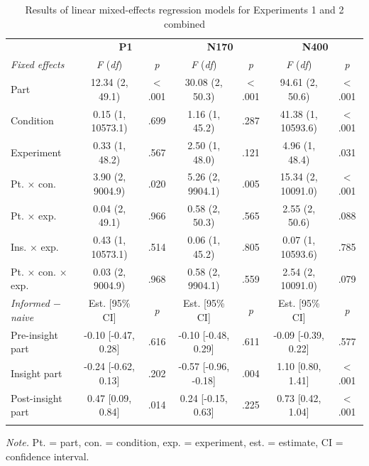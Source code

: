 \documentclass[
  english,
  man,12pt,twoside]{apa7}
\begin{document}
\begin{table}[tbp]

\begin{center}
\begin{threeparttable}

\caption{\label{tab:joint-table}Results of linear mixed-effects regression models for Experiments 1 and 2 combined}

\footnotesize{

\begin{tabular}{lcccccc}
\toprule
 & \multicolumn{2}{c}{\textbf{P1}} & \multicolumn{2}{c}{\textbf{N170}} & \multicolumn{2}{c}{\textbf{N400}} \\
\cmidrule(r){2-3} \cmidrule(r){4-5} \cmidrule(r){6-7}
\textit{Fixed effects} & \textit{F} (\textit{df}) & \textit{p} & \textit{F} (\textit{df}) & \textit{p} & \textit{F} (\textit{df}) & \textit{p}\\
\midrule
Part & 12.34 (2, 49.1) & < .001 & 30.08 (2, 50.3) & < .001 & 94.61 (2, 50.6) & < .001\\
Condition & 0.15 (1, 10573.1) & .699 & 1.16 (1, 45.2) & .287 & 41.38 (1, 10593.6) & < .001\\
Experiment & 0.33 (1, 48.2) & .567 & 2.50 (1, 48.0) & .121 & 4.96 (1, 48.4) & .031\\
Pt. × con. & 3.90 (2, 9004.9) & .020 & 5.26 (2, 9904.1) & .005 & 15.34 (2, 10091.0) & < .001\\
Pt. × exp. & 0.04 (2, 49.1) & .966 & 0.58 (2, 50.3) & .565 & 2.55 (2, 50.6) & .088\\
Ins. × exp. & 0.43 (1, 10573.1) & .514 & 0.06 (1, 45.2) & .805 & 0.07 (1, 10593.6) & .785\\
Pt. × con. × exp. & 0.03 (2, 9004.9) & .968 & 0.58 (2, 9904.1) & .559 & 2.54 (2, 10091.0) & .079\\
\textit{Informed $-$  naive} & Est. [95\% CI] & \textit{p} & Est. [95\% CI] & \textit{p} & Est. [95\% CI] & \textit{p}\\ \midrule
Pre-insight part & -0.10 [-0.47, 0.28] & .616 & -0.10 [-0.48, 0.29] & .611 & -0.09 [-0.39, 0.22] & .577\\
Insight part & -0.24 [-0.62, 0.13] & .202 & -0.57 [-0.96, -0.18] & .004 & 1.10 [0.80, 1.41] & < .001\\
Post-insight part & 0.47 [0.09, 0.84] & .014 & 0.24 [-0.15, 0.63] & .225 & 0.73 [0.42, 1.04] & < .001\\
\bottomrule
\addlinespace
\end{tabular}

}

\begin{tablenotes}[para]
\normalsize{\textit{Note.} Pt. = part, con. = condition, exp. = experiment, est. = estimate, CI = confidence interval.}
\end{tablenotes}

\end{threeparttable}
\end{center}

\end{table}
\end{document}
